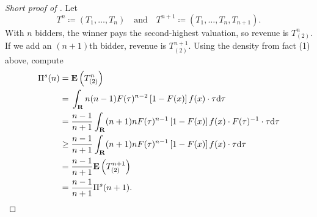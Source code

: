 \documentclass[11pt,letterpaper,reqno,oneside]{article}
\begin{document}
\begin{proof}[Short proof of ]
	Let
	\begin{equation*}
		T^n \coloneqq (T_1,\dots,T_n)
		\quad\text{and}\quad
		T^{n+1} \coloneqq (T_1,\dots,T_n,T_{n+1}) .
	\end{equation*}
	With $n$ bidders, the winner pays the second-highest valuation, so revenue is $T^n_{(2)}$. If we add an $(n+1)$th bidder, revenue is $T^{n+1}_{(2)}$. Using the density from fact (1) above, compute
	\begin{align*}
		\Pi^s(n)
		={}& \mathbf{E}\left( T^n_{(2)} \right) 
		\\
		={}& \int_{\mathbf{R}} 
		n (n-1)
		F(\tau)^{n-2} \left[ 1 - F(x) \right] f(x)
		\cdot \tau \mathrm{d} \tau
		\\
		={}& \frac{n-1}{n+1} \int_{\mathbf{R}} 
		(n+1) n
		F(\tau)^{n-1} \left[ 1 - F(x) \right] f(x)
		\cdot F(\tau)^{-1}
		\cdot \tau \mathrm{d} \tau
		\\
		\geq{}& \frac{n-1}{n+1} \int_{\mathbf{R}} 
		(n+1) n
		F(\tau)^{n-1} \left[ 1 - F(x) \right] f(x)
		\cdot \tau \mathrm{d} \tau
		\\
		={}& \frac{n-1}{n+1} \mathbf{E}\left( T^{n+1}_{(2)} \right) 
		\\
		={}& \frac{n-1}{n+1} \Pi^s(n+1) . \qedhere
	\end{align*}
\end{proof}
\end{document}
